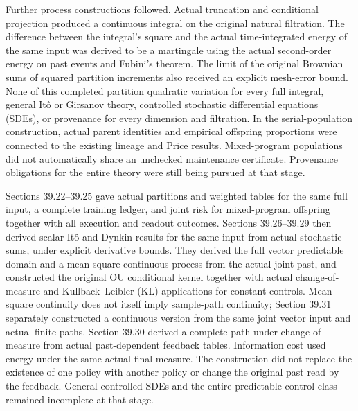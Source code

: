 \documentclass[
  english,
  11pt,
  oneside]{book}
\begin{document}
Further process constructions followed. Actual truncation and conditional projection produced a continuous integral on the original natural filtration. The difference between the integral's square and the actual time-integrated energy of the same input was derived to be a martingale using the actual second-order energy on past events and Fubini's theorem. The limit of the original Brownian sums of squared partition increments also received an explicit mesh-error bound. None of this completed partition quadratic variation for every full integral, general Itô or Girsanov theory, controlled stochastic differential equations (SDEs), or provenance for every dimension and filtration. In the serial-population construction, actual parent identities and empirical offspring proportions were connected to the existing lineage and Price results. Mixed-program populations did not automatically share an unchecked maintenance certificate. Provenance obligations for the entire theory were still being pursued at that stage.

Sections 39.22--39.25 gave actual partitions and weighted tables for the same full input, a complete training ledger, and joint risk for mixed-program offspring together with all execution and readout outcomes. Sections 39.26--39.29 then derived scalar Itô and Dynkin results for the same input from actual stochastic sums, under explicit derivative bounds. They derived the full vector predictable domain and a mean-square continuous process from the actual joint past, and constructed the original OU conditional kernel together with actual change-of-measure and Kullback--Leibler (KL) applications for constant controls. Mean-square continuity does not itself imply sample-path continuity; Section 39.31 separately constructed a continuous version from the same joint vector input and actual finite paths. Section 39.30 derived a complete path under change of measure from actual past-dependent feedback tables. Information cost used energy under the same actual final measure. The construction did not replace the existence of one policy with another policy or change the original past read by the feedback. General controlled SDEs and the entire predictable-control class remained incomplete at that stage.
\end{document}
